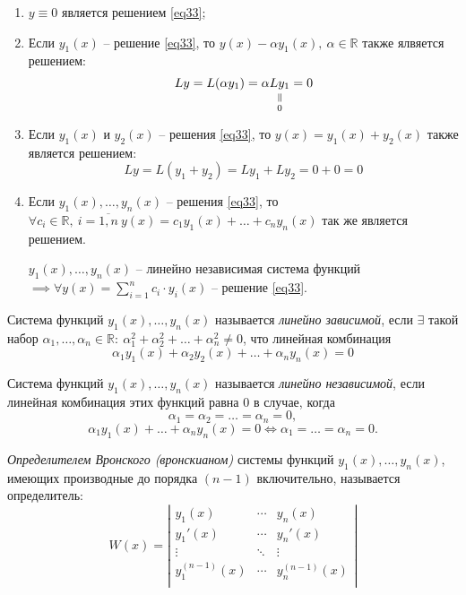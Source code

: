\begin{note}[Свойства решений однородного линейного уравнения \ref{eq33} или $Ly = 0$]\leavevmode
    \begin{enumerate}
        \item $y \equiv 0$ является решением \ref{eq33};
        \item Если $y_1(x)$ -- решение \ref{eq33}, то $y(x) - \alpha y_1(x), \ \alpha \in \mathbb{R}$ также ялвяется решением:
              \[
                  Ly = L(\alpha y_1) = \alpha \equalto{Ly_1}{0} = 0
              \]
        \item Если $y_1(x)$ и $y_2(x)$ -- решения \ref{eq33}, то $y(x) = y_1(x) + y_2(x)$ также является решением:
              \[
                  Ly = L(y_1 + y_2) = Ly_1 + Ly_2 = 0 + 0 = 0
              \]
        \item Если $y_1(x), \ldots, y_n(x)$ -- решения \ref{eq33}, то $\forall c_i \in \mathbb{R}, \ i =\overline{1,n} \ y(x) = c_1 y_1(x) + \ldots + c_n y_n(x)$ так же является решением.

              $y_1(x), \ldots, y_n(x)$ -- линейно независимая система функций $\implies \forall y(x) = \sum_{i = 1}^{n} c_i \cdot y_i(x)$ -- решение \ref{eq33}.
    \end{enumerate}
\end{note}

\begin{definition}
    Система функций $y_1(x), \ldots, y_n(x)$ называется \emph{линейно зависимой}, если $\exists$ такой набор $\alpha_1,\ldots,\alpha_n \in \mathbb{R}: \ \alpha_1^2 + \alpha_2^2 + \ldots + \alpha_n^2 \ne 0$, что линейная комбинация
    \[
        \alpha_1y_1(x) + \alpha_2y_2(x) + \ldots + \alpha_ny_n(x) = 0
    \]
\end{definition}

\begin{definition}
    Система функций $y_1(x),\ldots,y_n(x)$ называется \emph{линейно независимой}, если линейная комбинация этих функций равна $0$ в случае, когда
    \[
        \alpha_1 = \alpha_2 = \ldots = \alpha_n = 0,
    \]
    \[
        \alpha_1y_1(x) + \ldots + \alpha_ny_n(x) = 0 \iff \alpha_1 = \ldots = \alpha_n = 0.
    \]
\end{definition}

\begin{definition}
    \emph{Определителем Вронского (вронскианом)} системы функций $y_1(x),\ldots,y_n(x)$, имеющих производные до порядка $(n-1)$ включительно, называется определитель:
    \[
        W(x) = \left|\begin{matrix}
            y_1(x)         & \cdots & y_n(x)         \\
            y_1'(x)        & \cdots & y_n'(x)        \\
            \vdots         & \ddots & \vdots         \\
            y_1^{(n-1)}(x) & \cdots & y_n^{(n-1)}(x) \\
        \end{matrix}\right|
    \]
\end{definition}

